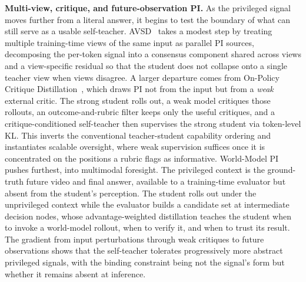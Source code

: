 \documentclass{article} %
\begin{document}
\textbf{Multi-view, critique, and future-observation PI.} As the privileged signal moves further from a literal answer, it begins to test the boundary of what can still serve as a usable self-teacher. AVSD~\citep{2605.20643} takes a modest step by treating multiple training-time views of the same input as parallel PI sources, decomposing the per-token signal into a consensus component shared across views and a view-specific residual so that the student does not collapse onto a single teacher view when views disagree. A larger departure comes from On-Policy Critique Distillation~\citep{2606.00424}, which draws PI not from the input but from a \emph{weak} external critic. The strong student rolls out, a weak model critiques those rollouts, an outcome-and-rubric filter keeps only the useful critiques, and a critique-conditioned self-teacher then supervises the strong student via token-level KL. This inverts the conventional teacher-student capability ordering and instantiates scalable oversight, where weak supervision suffices once it is concentrated on the positions a rubric flags as informative. World-Model PI~\citep{2606.03603} pushes furthest, into multimodal foresight. The privileged context is the ground-truth future video and final answer, available to a training-time evaluator but absent from the student's perception. The student rolls out under the unprivileged context while the evaluator builds a candidate set at intermediate decision nodes, whose advantage-weighted distillation teaches the student when to invoke a world-model rollout, when to verify it, and when to trust its result. The gradient from input perturbations through weak critiques to future observations shows that the self-teacher tolerates progressively more abstract privileged signals, with the binding constraint being not the signal's form but whether it remains absent at inference.
\end{document}
